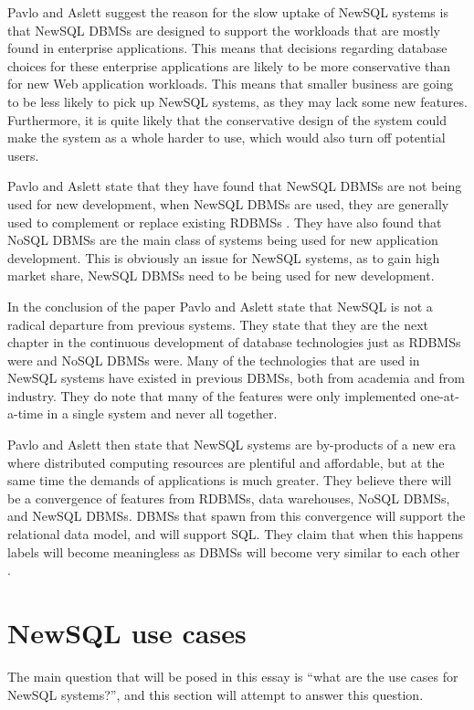 \documentclass[10pt, conference]{IEEEtran}
\begin{document}
Pavlo and Aslett suggest the reason for the slow uptake of NewSQL systems is that NewSQL DBMSs are designed to support the workloads that are mostly found in enterprise applications. This means that decisions regarding database choices for these enterprise applications are likely to be more conservative than for new Web application workloads. This means that smaller business are going to be less likely to pick up NewSQL systems, as they may lack some new features. Furthermore, it is quite likely that the conservative design of the system could make the system as a whole harder to use, which would also turn off potential users.

Pavlo and Aslett state that they have found that NewSQL DBMSs are not being used for new development, when NewSQL DBMSs are used, they are generally used to complement or replace existing RDBMSs  \cite{pavlo}. They have also found that NoSQL DBMSs are the main class of systems being used for new application development. This is obviously an issue for NewSQL systems, as to gain high market share, NewSQL DBMSs need to be being used for new development.

In the conclusion of the paper Pavlo and Aslett state that NewSQL is not a radical departure from previous systems. They state that they are the next chapter in the continuous development of database technologies just as RDBMSs were and NoSQL DBMSs were. Many of the technologies that are used in NewSQL systems have existed in previous DBMSs, both from academia and from industry. They do note that many of the features were only implemented one-at-a-time in a single system and never all together.

Pavlo and Aslett then state that NewSQL systems are by-products of a new era where distributed computing resources are plentiful and affordable, but at the same time the demands of applications is much greater. They believe there will be a convergence of features from RDBMSs, data warehouses, NoSQL DBMSs, and NewSQL DBMSs. DBMSs that spawn from this convergence will support the relational data model, and will support SQL. They claim that when this happens labels will become meaningless as DBMSs will become very similar to each other  \cite{pavlo}.

\section{NewSQL use cases}

The main question that will be posed in this essay is ``what are the use cases for NewSQL systems?'', and this section will attempt to answer this question.
\end{document}
